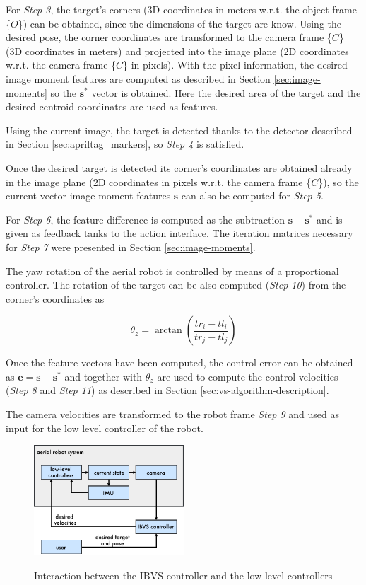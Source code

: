 For \emph{Step 3}, the target's corners (3D coordinates in meters w.r.t. the object frame \{$O$\}) can be obtained, since the dimensions of the target are know. Using the desired pose, the corner coordinates are transformed to the camera frame \{$C$\} (3D coordinates in meters) and projected into the image plane (2D coordinates w.r.t. the camera frame \{$C$\} in pixels). With the pixel information, the desired image moment features are computed as described in Section \ref{sec:image-moments} so the $\bm{s}^\ast$ vector is obtained. Here the desired area of the target and the desired centroid coordinates are used as features.
 
Using the current image, the target is detected thanks to the detector described in Section \ref{sec:apriltag_markers}, so \emph{Step 4} is satisfied.
 
Once the desired target is detected its corner's coordinates are obtained already in the image plane (2D coordinates in pixels w.r.t. the camera frame \{$C$\}), so the current vector image moment features $\bm{s}$ can also be computed for \emph{Step 5}.

For \emph{Step 6}, the feature difference is computed as the subtraction $\bm{s} - \bm{s}^\ast$ and is given as feedback tanks to the action interface. The iteration matrices necessary for \emph{Step 7} were presented in Section \ref{sec:image-moments}.

The yaw rotation of the aerial robot is controlled by means of a proportional controller. The rotation of the target can be also computed (\emph{Step 10}) from the corner's coordinates as

\begin{equation}
 \theta_z = \arctan \left( \frac{tr_i - tl_i}{tr_j - tl_j} \right) 
\end{equation}
 
 Once the feature vectors have been computed, the control error can be obtained as $\bm{e} = \bm{s} - \bm{s}^\ast$ and together with $\theta_z$ are used to compute the control velocities (\emph{Step 8} and \emph{Step 11}) as described in Section \ref{sec:vs-algorithm-description}.
 
 The camera velocities are transformed to the robot frame \emph{Step 9} and used as input for the low level controller of the robot.
	
\begin{figure}[!htb]
		\caption{Interaction between the IBVS controller and the low-level controllers}
	\centering
	\includegraphics[width=0.5\textwidth]{content/chapter_04/images/context_diagram.pdf}
	\label{fig:low-level-ibvs}
\end{figure}

